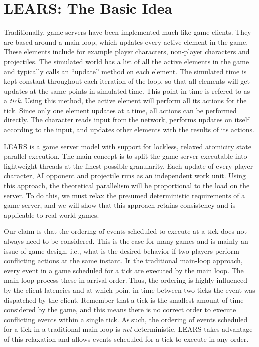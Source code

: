 \section{LEARS: The Basic Idea}\label{sec:concept}
Traditionally, game servers have been implemented much like game
clients. They are based around a main loop, which updates every active
element in the game. These elements include for example player
characters, non-player characters and projectiles. The simulated world
has a list of all the active elements in the game and typically calls
an ``update'' method on each element. The simulated time is kept
constant throughout each iteration of the loop, so that all elements
will get updates at the same points in simulated time. This point in
time is refered to as a \textit{tick}.  Using this method, the active
element will perform all its actions for the tick. Since only one
element updates at a time, all actions can be performed directly. The
character reads input from the network, performs updates on itself
according to the input, and updates other elements with the results of
its actions.

%
LEARS is a game server model with support for lockless, relaxed
atomicity state parallel execution.  The main concept is to split the
game server executable into lightweight threads at the finest possible
granularity. Each update of every player character, AI opponent and
projectile runs as an independent work unit. Using this approach, the
theoretical parallelism will be proportional to the load on the
server. To do this, we must relax the presumed deterministic
requirements of a game server, and we will show that this approach
retains consistency and is applicable to real-world games.

Our claim is that the ordering of events scheduled to execute at a
tick does not always need to be considered. This is the case for many
games and is mainly an issue of game design, i.e., what is the desired
behavior if two players perform conflicting
actions at the same instant. In the
traditional main-loop approach, every event in a
game scheduled for a tick are executed by the main loop. The
main loop process these in arrival order. Thus, the ordering is highly
influenced by the client latencies and at which point in time between
two ticks the event was dispatched by the
client. Remember that a tick is the smallest amount of time
considered by the game, and this means there is no correct order to
execute conflicting events within a single tick. As such, the
ordering of events scheduled for a tick in a traditional main
loop is \textit{not} deterministic. LEARS takes advantage of this
relaxation and allows events scheduled
for a tick to execute in any order.

